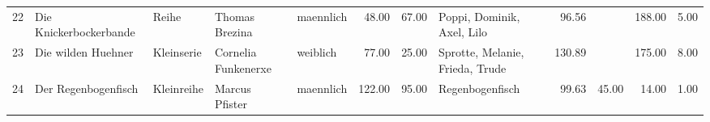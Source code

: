\begin{table}
\begin{center}
{\begin{tabular}{rllllrrlrrrr}
  22 & Die Knickerbockerbande                                                                                                                                                                                                                                          & Reihe & Thomas Brezina                                                                                                                                                                                                                                                  & maennlich & 48.00 & 67.00 & Poppi, Dominik, Axel, Lilo                                                                                                                                                                                                                                      & 96.56 &  & 188.00 & 5.00 \\ 
  23 & Die wilden Huehner                                                                                                                                                                                                                                              & Kleinserie & Cornelia Funkenerxe                                                                                                                                                                                                                                             & weiblich & 77.00 & 25.00 & Sprotte, Melanie, Frieda, Trude                                                                                                                                                                                                                                 & 130.89 &  & 175.00 & 8.00 \\ 
  24 & Der Regenbogenfisch                                                                                                                                                                                                                                             & Kleinreihe & Marcus Pfister                                                                                                                                                                                                                                                  & maennlich & 122.00 & 95.00 & Regenbogenfisch                                                                                                                                                                                                                                                 & 99.63 & 45.00 & 14.00 & 1.00 \\ 

\end{tabular}}
\end{center}
\end{table}

